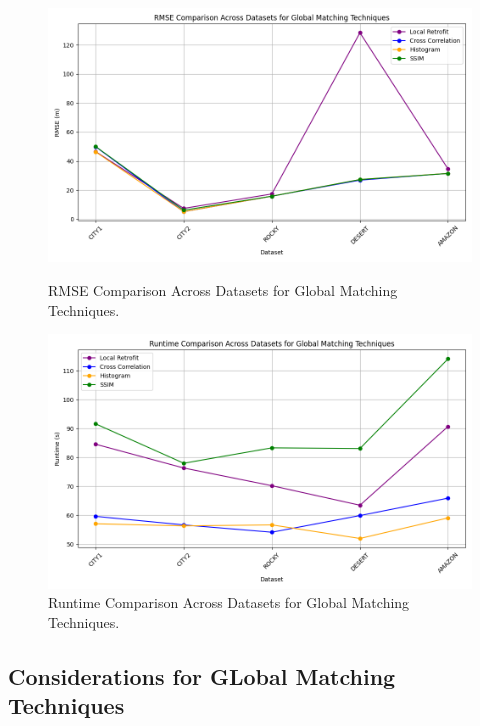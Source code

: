\begin{figure}[H]
    \centering
    \begin{minipage}{0.45\textwidth}
        \centering
        \includegraphics[width=\textwidth]{./Chapter 4/testresults/rmse_global_matching.png}
        \caption{RMSE Comparison Across Datasets for Global Matching Techniques.}
        \label{fig:rmse_global_matching}
    \end{minipage}\hfill
    \begin{minipage}{0.45\textwidth}
        \centering
        \includegraphics[width=\textwidth]{./Chapter 4/testresults/runtime_global_matching.png}
        \caption{Runtime Comparison Across Datasets for Global Matching Techniques.}
        \label{fig:runtime_global_matching}
    \end{minipage}
\end{figure}

\subsection{Considerations for GLobal Matching Techniques}

